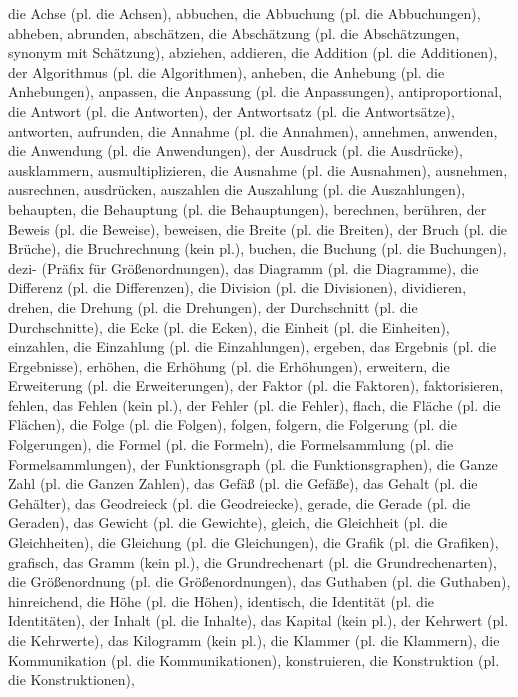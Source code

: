 die Achse (pl. die Achsen),
abbuchen,
die Abbuchung (pl. die Abbuchungen),
abheben,
abrunden,
abschätzen,
die Abschätzung (pl. die Abschätzungen, synonym mit Schätzung),
abziehen,
addieren,
die Addition (pl. die Additionen),
der Algorithmus (pl. die Algorithmen),
anheben,
die Anhebung (pl. die Anhebungen),
anpassen,
die Anpassung (pl. die Anpassungen),
antiproportional,
die Antwort (pl. die Antworten),
der Antwortsatz (pl. die Antwortsätze),
antworten,
aufrunden,
die Annahme (pl. die Annahmen),
annehmen,
anwenden,
die Anwendung (pl. die Anwendungen),
der Ausdruck (pl. die Ausdrücke),
ausklammern,
ausmultiplizieren,
die Ausnahme (pl. die Ausnahmen),
ausnehmen,
ausrechnen,
ausdrücken,
auszahlen
die Auszahlung (pl. die Auszahlungen),
behaupten,
die Behauptung (pl. die Behauptungen),
berechnen,
berühren,
der Beweis (pl. die Beweise),
beweisen,
die Breite (pl. die Breiten),
der Bruch (pl. die Brüche),
die Bruchrechnung (kein pl.),
buchen,
die Buchung (pl. die Buchungen),
dezi- (Präfix für Größenordnungen),
das Diagramm (pl. die Diagramme),
die Differenz (pl. die Differenzen),
die Division (pl. die Divisionen),
dividieren,
drehen,
die Drehung (pl. die Drehungen),
der Durchschnitt (pl. die Durchschnitte),
die Ecke (pl. die Ecken),
die Einheit (pl. die Einheiten),
einzahlen,
die Einzahlung (pl. die Einzahlungen),
ergeben,
das Ergebnis (pl. die Ergebnisse),
erhöhen,
die Erhöhung (pl. die Erhöhungen),
erweitern,
die Erweiterung (pl. die Erweiterungen),
der Faktor (pl. die Faktoren),
faktorisieren,
fehlen,
das Fehlen (kein pl.),
der Fehler (pl. die Fehler),
flach,
die Fläche (pl. die Flächen),
die Folge (pl. die Folgen),
folgen,
folgern,
die Folgerung (pl. die Folgerungen),
die Formel (pl. die Formeln),
die Formelsammlung (pl. die Formelsammlungen),
der Funktionsgraph (pl. die Funktionsgraphen),
die Ganze Zahl (pl. die Ganzen Zahlen),
das Gefäß (pl. die Gefäße),
das Gehalt (pl. die Gehälter),
das Geodreieck (pl. die Geodreiecke),
gerade,
die Gerade (pl. die Geraden),
das Gewicht (pl. die Gewichte),
gleich,
die Gleichheit (pl. die Gleichheiten),
die Gleichung (pl. die Gleichungen),
die Grafik (pl. die Grafiken),
grafisch,
das Gramm (kein pl.),
die Grundrechenart (pl. die Grundrechenarten),
die Größenordnung (pl. die Größenordnungen),
das Guthaben (pl. die Guthaben),
hinreichend,
die Höhe (pl. die Höhen),
identisch,
die Identität (pl. die Identitäten),
der Inhalt (pl. die Inhalte),
das Kapital (kein pl.),
der Kehrwert (pl. die Kehrwerte),
das Kilogramm (kein pl.),
die Klammer (pl. die Klammern),
die Kommunikation (pl. die Kommunikationen),
konstruieren,
die Konstruktion (pl. die Konstruktionen),
